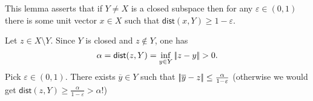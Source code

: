 \documentclass{article}
\begin{document}
\begin{remark}
	This lemma asserts that if $Y\neq X$ is a closed subspace then for any $\varepsilon\in(0,1)$ there is some unit vector $x\in X$ such that $\mathsf{dist}(x,Y)\geq 1-\varepsilon$.
\end{remark}
\begin{fancyproof}
	Let $z\in X\setminus Y$. Since $Y$ is closed and $z\notin Y$, one has
	\begin{equation*}
		\alpha=\mathsf{dist}(z,Y)=\inf_{y\in Y}\norm{z-y}>0.
	\end{equation*}
	Pick $\varepsilon\in(0,1)$. There exists $\overline{y}\in Y$ such that $\left|\negthinspace\left|\overline{y}-z\right|\negthinspace\right|\leq\frac{\alpha}{1-\varepsilon}$ (otherwise we would get $\mathsf{dist}(z,Y)\geq\frac{\alpha}{1-\varepsilon}>\alpha$!)
\end{fancyproof}
\end{document}
